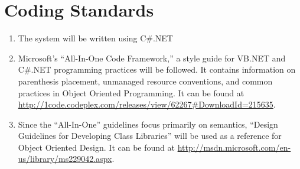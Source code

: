 \section{Coding Standards}
\begin{enumerate}
    \item The system will be written using C\#.NET
    \item Microsoft's ``All-In-One Code Framework,'' a style guide for VB.NET and C\#.NET programming practices will be followed. It contains information on parenthesis placement, unmanaged resource conventions, and common practices in Object Oriented Programming.  It can be found at \url{http://1code.codeplex.com/releases/view/62267#DownloadId=215635}.
    \item Since the ``All-In-One'' guidelines focus primarily on semantics, ``Design Guidelines for Developing Class Libraries'' will be used as a reference for Object Oriented Design. It can be found at \url{http://msdn.microsoft.com/en-us/library/ms229042.aspx}.
\end{enumerate}
